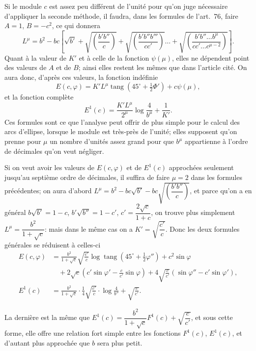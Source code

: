 \documentclass{article}
\begin{document}
Si le module $c$ est assez peu différent de l'unité pour qu'on juge nécessaire d'appliquer la seconde méthode, il faudra, dans les formules de l'art.~76, faire $A=1$, $B=-c^{2}$, ce qui donnera
\[ L^{\mu}=b^{2}-bc\left[\sqrt{b'}+\sqrt{\left(\frac{b'b''}{c}\right)}+\sqrt{\left(\frac{b'b''b'''}{cc'}\right)}\ldots+\sqrt{\left(\frac{b'b''\ldots b^{\mu}}{cc'\ldots c^{\mu-2}}\right)}\right]. \]
Quant à la valeur de $K'$ et à celle de la fonction $\psi(\mu)$, elles ne dépendent point des valeurs de $A$ et de $B$; ainsi elles restent les mêmes que dans l'article cité. On aura donc, d'après ces valeurs, la fonction indéfinie
\[ E(c,\varphi)=K'L^{\mu}\operatorname{tang}(45^{\circ}+\tfrac{1}{2}\Phi')+c\psi(\mu), \]
et la fonction complète
\[ E^{1}(c)=\frac{K'L^{\mu}}{2^{\mu}}\log\frac{4}{b^{\mu}}+\frac{1}{K'}. \]
Ces formules sont ce que l'analyse peut offrir de plus simple pour le calcul des arcs d'ellipse, lorsque le module est très-près de l'unité; elles supposent qu'on prenne pour $\mu$ un nombre d'unités assez grand pour que $b^{\mu}$ appartienne à l'ordre de décimales qu'on veut négliger.

Si on veut avoir les valeurs de $E(c,\varphi)$ et de $E^{1}(c)$ approchées seulement jusqu'au septième ordre de décimales, il suffira de faire $\mu=2$ dans les formules précédentes; on aura d'abord $L^{\mu}=b^{2}-bc\sqrt{b'}-bc\sqrt{\left(\dfrac{b'b''}{c}\right)}$, et parce qu'on a en général $b\sqrt{b'}=1-c$, $b'\sqrt{b''}=1-c'$, $c'=\dfrac{2\sqrt{c}}{1+c}$, on trouve plus simplement $L^{\mu}=\dfrac{b^{2}}{1+\sqrt{c}}$: mais dans le même cas on a $K'=\sqrt{\dfrac{c'}{c}}$. Donc les deux formules générales se réduisent à celles-ci
\[ \begin{aligned} E(c,\varphi)&=\frac{b^{2}}{1+\sqrt{c}}\sqrt{\frac{c'}{c}}\log\operatorname{tang}(45^{\circ}+\tfrac{1}{2}\varphi'')+c^{2}\sin\varphi\\ &\quad+2\sqrt{c}\left(c'\sin\varphi'-\frac{c}{c'}\sin\varphi\right)+4\sqrt{\frac{c}{c'}}(\sin\varphi''-c'\sin\varphi'),\\ E^{1}(c)&=\frac{b^{2}}{1+\sqrt{c}}\cdot\frac{1}{4}\sqrt{\frac{c'}{c}}\cdot\log\frac{4}{b''}+\sqrt{\frac{c}{c'}}. \end{aligned} \]

La dernière est la même que $E^{1}(c)=\dfrac{b^{2}}{1+\sqrt{c}}F^{1}(c)+\sqrt{\dfrac{c}{c'}}$, et sous cette forme, elle offre une relation fort simple entre les fonctions $F^{1}(c)$, $E^{1}(c)$, et d'autant plus approchée que $b$ sera plus petit.
\end{document}
